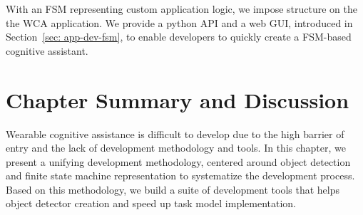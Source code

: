 With an FSM representing custom application logic, we impose structure on the
the WCA application. We provide a python API and a web GUI, introduced in
Section~\ref{sec: app-dev-fsm}, to enable developers to quickly create a
FSM-based cognitive assistant. 




\section{Chapter Summary and Discussion}

Wearable cognitive assistance is difficult to develop due to the high barrier of
entry and the lack of development methodology and tools. In this chapter, we
present a unifying development methodology, centered around object detection and
finite state machine representation to systematize the development process.
Based on this methodology, we build a suite of development tools that helps
object detector creation and speed up task model implementation. 

